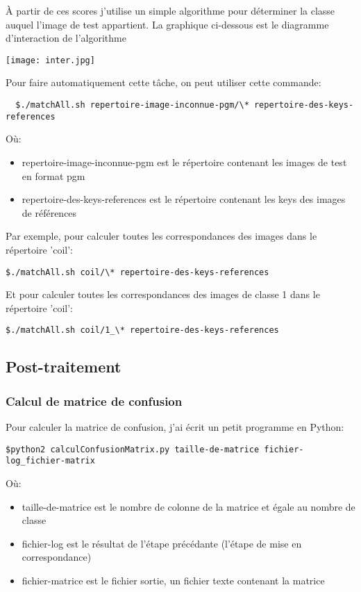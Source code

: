 \documentclass[french,12pt,a4paper,oneside,notitlepage]{report}
\begin{document}
À partir de ces scores j'utilise un simple algorithme pour déterminer la classe auquel l'image de test appartient. 
La graphique ci-dessous est le diagramme d'interaction de l'algorithme
\begin{center}
\texttt{[image: inter.jpg]}
\end{center}

Pour faire automatiquement cette tâche, on peut utiliser cette commande:
\begin{lstlisting}
  $./matchAll.sh repertoire-image-inconnue-pgm/\* repertoire-des-keys-references 
\end{lstlisting}
Où:
\begin{itemize}
 \item repertoire-image-inconnue-pgm est le répertoire contenant les images de test en format pgm
 \item repertoire-des-keys-references est le répertoire contenant les keys des images de références 
\end{itemize}

Par exemple, pour calculer toutes les correspondances des images dans le répertoire 'coil':
\begin{lstlisting}
$./matchAll.sh coil/\* repertoire-des-keys-references
\end{lstlisting}
Et pour calculer toutes les correspondances des images de classe 1 dans le répertoire 'coil':
\begin{lstlisting}
$./matchAll.sh coil/1_\* repertoire-des-keys-references
\end{lstlisting}

\subsection{Post-traitement}
\subsubsection{Calcul de matrice de confusion }
Pour calculer la matrice de confusion, j'ai écrit un petit programme en Python:
\begin{lstlisting}
$python2 calculConfusionMatrix.py taille-de-matrice fichier-log_fichier-matrix
\end{lstlisting}
Où:
\begin{itemize}
 \item taille-de-matrice est le nombre de colonne de la matrice et égale au nombre de classe
 \item fichier-log est le résultat de l'étape précédante (l'étape de mise en correspondance) 
 \item fichier-matrice est le fichier sortie, un fichier texte contenant la matrice
\end{itemize}
\end{document}
